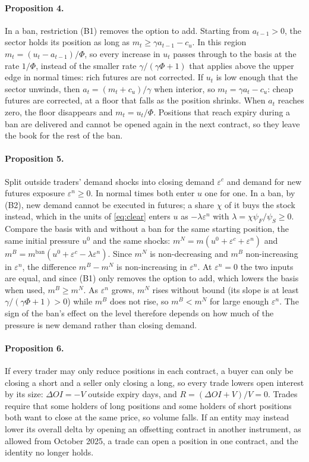 \paragraph{Proposition 4.} In a ban, restriction (B1) removes the option to add. Starting from $a_{t-1}>0$, the sector
holds its position as long as $m_t\ge\gamma a_{t-1}-c_u$. In this region $m_t=(u_t-a_{t-1})/\Phi$, so every increase
in $u_t$ passes through to the basis at the rate $1/\Phi$, instead of the smaller rate $\gamma/(\gamma\Phi+1)$ that
applies above the upper edge in normal times: rich futures are not corrected. If $u_t$ is low enough that the sector
unwinds, then $a_t=(m_t+c_u)/\gamma$ when interior, so $m_t=\gamma a_t-c_u$: cheap futures are corrected, at a floor that
falls as the position shrinks. When $a_t$ reaches zero, the floor disappears and $m_t=u_t/\Phi$. Positions that reach
expiry during a ban are delivered and cannot be opened again in the next contract, so they leave the book for the rest of
the ban.

\paragraph{Proposition 5.} Split outside traders' demand shocks into closing demand $\varepsilon^c$ and demand for new
futures exposure $\varepsilon^n\ge 0$. In normal times both enter $u$ one for one. In a ban, by (B2), new demand
cannot be executed in futures; a share $\chi$ of it buys the stock instead, which in the units of \eqref{eq:clear} enters
$u$ as $-\lambda\varepsilon^n$ with $\lambda=\chi\psi_F/\psi_S\ge0$. Compare the basis with and without a ban for the same
starting position, the same initial pressure $u^0$ and the same shocks: $m^N=m(u^0+\varepsilon^c+\varepsilon^n)$ and
$m^B=m^{\text{ban}}(u^0+\varepsilon^c-\lambda\varepsilon^n)$. Since $m^N$ is non-decreasing and $m^B$ non-increasing in
$\varepsilon^n$, the difference $m^B-m^N$ is non-increasing in $\varepsilon^n$. At $\varepsilon^n=0$ the two inputs are
equal, and since (B1) only removes the option to add, which lowers the basis when used, $m^B\ge m^N$. As $\varepsilon^n$
grows, $m^N$ rises without bound (its slope is at least $\gamma/(\gamma\Phi+1)>0$) while $m^B$ does not rise, so
$m^B<m^N$ for large enough $\varepsilon^n$. The sign of the ban's effect on the level therefore depends on how much of the
pressure is new demand rather than closing demand.

\paragraph{Proposition 6.} If every trader may only reduce positions in each contract, a buyer can only be closing a
short and a seller only closing a long, so every trade lowers open interest by its size: $\Delta OI=-V$ outside expiry
days, and $R=(\Delta OI+V)/V=0$. Trades require that some holders of long positions and some holders of short positions
both want to close at the same price, so volume falls. If an entity may instead lower its overall delta by opening an
offsetting contract in another instrument, as allowed from October 2025, a trade can open a position in one contract,
and the identity no longer holds.
